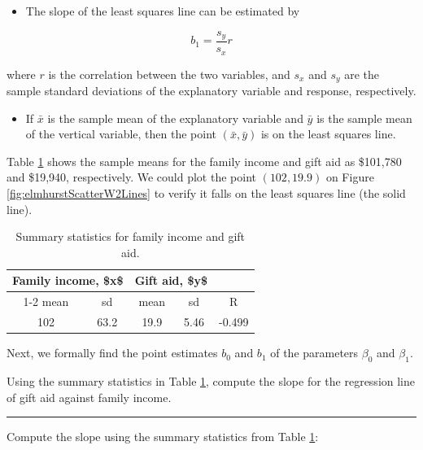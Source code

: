 \documentclass[
  10pt,
  openany]{book}
\providecommand{\tightlist}{%
  \setlength{\itemsep}{0pt}\setlength{\parskip}{0pt}}
\theoremstyle{definition}
\theoremstyle{definition}
\theoremstyle{definition}
\theoremstyle{definition}
\theoremstyle{remark}
\begin{document}
\begin{itemize}
\tightlist
\item
  The slope of the least squares line can be estimated by
\end{itemize}

\[b_1 = \frac{s_y}{s_x} r \]

where \(r\) is the correlation between the two variables, and \(s_x\) and \(s_y\) are the sample standard deviations of the explanatory variable and response, respectively.

\begin{itemize}
\tightlist
\item
  If \(\bar{x}\) is the sample mean of the explanatory variable and \(\bar{y}\) is the sample mean of the vertical variable, then the point \((\bar{x}, \bar{y})\) is on the least squares line.
\end{itemize}

Table \ref{tab:summaryStatsElmhurstRegr} shows the sample means for the family income and gift aid as \$101,780 and \$19,940, respectively.
We could plot the point \((102, 19.9)\) on Figure \ref{fig:elmhurstScatterW2Lines} to verify it falls on the least squares line (the solid line).

\begin{table}
\centering
\caption{\label{tab:summaryStatsElmhurstRegr}Summary statistics for family income and gift aid.}
\centering
\begin{tabular}[t]{c|c|c|c|c}
\hline
\multicolumn{2}{c|}{Family income, \$x\$} & \multicolumn{2}{c|}{Gift aid, \$y\$} & \multicolumn{1}{c}{ } \\
\cline{1-2} \cline{3-4}
mean & sd & mean & sd & R\\
\hline
102 & 63.2 & 19.9 & 5.46 & -0.499\\
\hline
\end{tabular}
\end{table}

Next, we formally find the point estimates \(b_0\) and \(b_1\) of the parameters \(\beta_0\) and \(\beta_1\).

Using the summary statistics in Table \ref{tab:summaryStatsElmhurstRegr}, compute the slope for the regression line of gift aid against family income.

\begin{center}\rule{0.5\linewidth}{0.5pt}\end{center}

Compute the slope using the summary statistics from Table \ref{tab:summaryStatsElmhurstRegr}:
\end{document}

